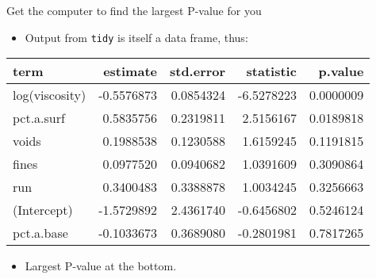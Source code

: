 \begin{frame}[fragile]{Get the computer to find the largest P-value for
you}
\protect\hypertarget{get-the-computer-to-find-the-largest-p-value-for-you}{}
\begin{itemize}
\tightlist
\item
  Output from \texttt{tidy} is itself a data frame, thus:
\end{itemize}

\begin{Shaded}
\begin{Highlighting}[]
\NormalTok{) }\OperatorTok{\%\textgreater{}\%}\StringTok{ }
\end{Highlighting}
\end{Shaded}

\begin{longtable}[]{@{}lrrrr@{}}
\toprule
term & estimate & std.error & statistic & p.value\tabularnewline
\midrule
\endhead
log(viscosity) & -0.5576873 & 0.0854324 & -6.5278223 &
0.0000009\tabularnewline
pct.a.surf & 0.5835756 & 0.2319811 & 2.5156167 &
0.0189818\tabularnewline
voids & 0.1988538 & 0.1230588 & 1.6159245 & 0.1191815\tabularnewline
fines & 0.0977520 & 0.0940682 & 1.0391609 & 0.3090864\tabularnewline
run & 0.3400483 & 0.3388878 & 1.0034245 & 0.3256663\tabularnewline
(Intercept) & -1.5729892 & 2.4361740 & -0.6456802 &
0.5246124\tabularnewline
pct.a.base & -0.1033673 & 0.3689080 & -0.2801981 &
0.7817265\tabularnewline
\bottomrule
\end{longtable}

\begin{itemize}
\tightlist
\item
  Largest P-value at the bottom.
\end{itemize}
\end{frame}

